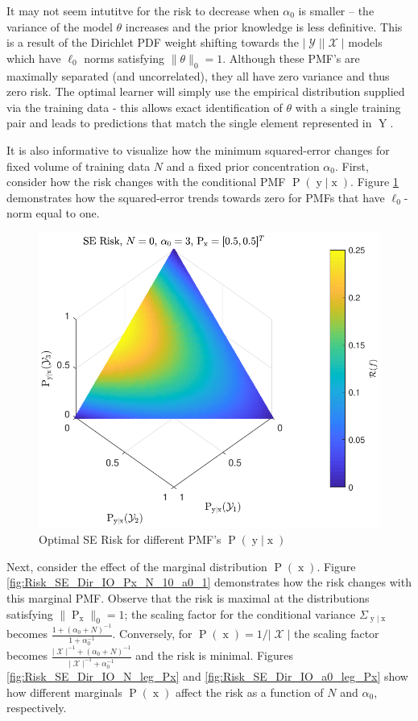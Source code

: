 \documentclass[12pt]{article}
\DeclareMathOperator{\xrm}{\mathrm{x}}
\DeclareMathOperator{\yrm}{\mathrm{y}}
\DeclareMathOperator{\Yrm}{\mathrm{Y}}
\DeclareMathOperator{\Prm}{\mathrm{P}}
\DeclareMathOperator{\Xcal}{\mathcal{X}}
\DeclareMathOperator{\Ycal}{\mathcal{Y}}
\begin{document}
It may not seem intutitve for the risk to decrease when $\alpha_0$ is smaller -- the variance of the model $\theta$ increases and the prior knowledge is less definitive. This is a result of the Dirichlet PDF weight shifting towards the $|\Ycal||\Xcal|$ models which have $\ell_0$ norms satisfying $\| \theta \|_0 = 1$. Although these PMF's are maximally separated (and uncorrelated), they all have zero variance and thus zero risk. The optimal learner will simply use the empirical distribution supplied via the training data - this allows exact identification of $\theta$ with a single training pair and leads to predictions that match the single element represented in $\Yrm$.

It is also informative to visualize how the minimum squared-error changes for fixed volume of training data $N$ and a fixed prior concentration $\alpha_0$. First, consider how the risk changes with the conditional PMF $\Prm(\yrm | \xrm)$. Figure \ref{fig:Risk_SE_Dir_IO_Pyx} demonstrates how the squared-error trends towards zero for PMFs that have $\ell_0$-norm equal to one.
\begin{figure}
\centering
\includegraphics[scale=1.0]{Risk_SE_Dir_IO_Pyx.pdf}
\caption{Optimal SE Risk for different PMF's $\Prm(\yrm | \xrm)$}
\label{fig:Risk_SE_Dir_IO_Pyx}
\end{figure}
Next, consider the effect of the marginal distribution $\Prm(\xrm)$. Figure \ref{fig:Risk_SE_Dir_IO_Px_N_10_a0_1} demonstrates how the risk changes with this marginal PMF. Observe that the risk is maximal at the distributions satisfying $\| \Prm_{\xrm} \|_0 = 1$; the scaling factor for the conditional variance $\Sigma_{\yrm | \xrm}$ becomes $\frac{1 + (\alpha_0+N)^{-1}}{1 + \alpha_0^{-1}}$. Conversely, for $\Prm(\xrm) = 1/|\Xcal|$ the scaling factor becomes $\frac{|\Xcal|^{-1} + (\alpha_0+N)^{-1}}{|\Xcal|^{-1} + \alpha_0^{-1}}$ and the risk is minimal. Figures \ref{fig:Risk_SE_Dir_IO_N_leg_Px} and \ref{fig:Risk_SE_Dir_IO_a0_leg_Px} show how different marginals $\Prm(\xrm)$ affect the risk as a function of $N$ and $\alpha_0$, respectively.
\end{document}
